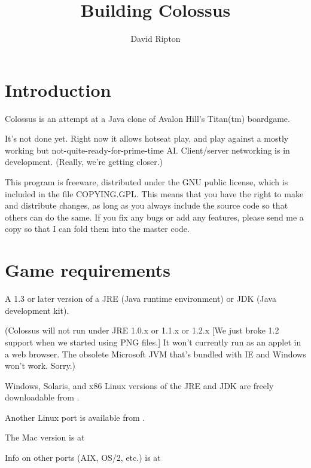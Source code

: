 \documentclass{article}
\begin{document}

\title{Building Colossus}

\author{David Ripton}

\maketitle

\section*{Introduction}

Colossus is an attempt at a Java clone of Avalon Hill's Titan(tm) boardgame.

It's not done yet. Right now it allows hotseat play, and play against a
mostly working but not-quite-ready-for-prime-time AI. Client/server 
networking is in development. (Really, we're getting closer.)

This program is freeware, distributed under the GNU public license, which
is included in the file COPYING.GPL. This means that you have the right to
make and distribute changes, as long as you always include the source code
so that others can do the same. If you fix any bugs or add any features,
please send me a copy so that I can fold them into the master code.

\section{Game requirements}

A 1.3 or later version of a JRE (Java runtime environment) or JDK (Java development kit). 

(Colossus will not run under JRE 1.0.x or 1.1.x or 1.2.x  [We just broke 1.2
support when we started using PNG files.]  It won't currently run as an applet 
in a web browser. The obsolete Microsoft JVM that's bundled with IE and Windows 
won't work. Sorry.)

Windows, Solaris, and x86 Linux versions of the JRE and JDK are freely 
downloadable from .

Another Linux port is available from
.

The Mac version is at

Info on other ports (AIX, OS/2, etc.) is at 
\end{document}

